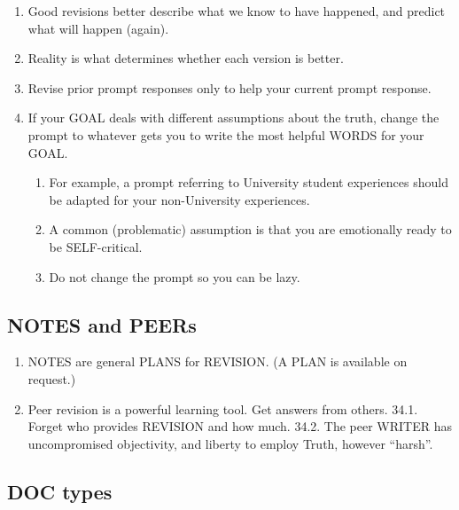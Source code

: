 \documentclass[
]{book}
\providecommand{\tightlist}{%
  \setlength{\itemsep}{0pt}\setlength{\parskip}{0pt}}
\begin{document}
\begin{enumerate}
\def\labelenumi{\arabic{enumi}.}
\setcounter{enumi}{28}
\tightlist
\item
  Good revisions better describe what we know to have happened, and
  predict what will happen (again).
\item
  Reality is what determines whether each version is better.
\item
  Revise prior prompt responses only to help your current prompt
  response.
\item
  If your GOAL deals with different assumptions about the truth, change
  the prompt to whatever gets you to write the most helpful WORDS for your GOAL.

  \begin{enumerate}
  \def\labelenumii{\arabic{enumii}.}
  \tightlist
  \item
    For example, a prompt referring to University student
    experiences should be adapted for your non-University
    experiences.
  \item
    A common (problematic) assumption is that you are emotionally
    ready to be SELF-critical.
  \item
    Do not change the prompt so you can be lazy.
  \end{enumerate}
\end{enumerate}

\hypertarget{notes-and-peers}{%
\subsection{NOTES and PEERs}\label{notes-and-peers}}

\begin{enumerate}
\def\labelenumi{\arabic{enumi}.}
\setcounter{enumi}{32}
\item
  NOTES are general PLANS for REVISION. (A PLAN is available on request.)
\item
  Peer revision is a powerful learning tool. Get answers from others.
  34.1. Forget who provides REVISION and how much.
  34.2. The peer WRITER has uncompromised objectivity, and liberty to
  employ Truth, however ``harsh''.
\end{enumerate}

\hypertarget{doc-types}{%
\subsection{DOC types}\label{doc-types}}
\end{document}
